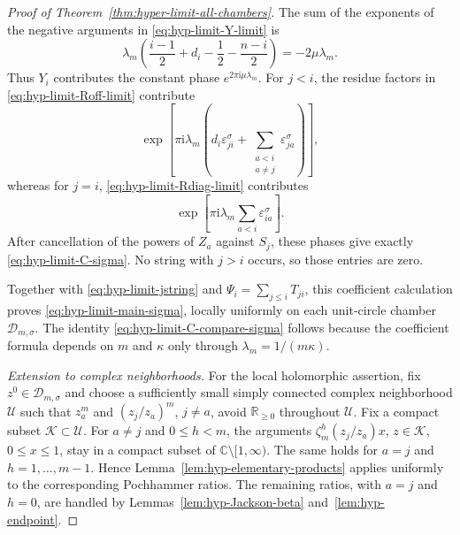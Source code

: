 \documentclass[12pt]{amsart}
\theoremstyle{definition}
\numberwithin{equation}{section}
\theoremstyle{definition}
\let\mc\mathcal
\let\eps\varepsilon
\let\ka\kappa
\let\si\sigma
\let\ge\geqslant
\let\le\leqslant
\def\C{{\mathbb C}}
\def\R{{\mathbb R}}
\def\beq{\begin{equation}}
\def\eeq{\end{equation}}
\begin{document}
\begin{proof}[Proof of Theorem~\ref{thm:hyper-limit-all-chambers}]
The sum of the exponents of the negative arguments in
\eqref{eq:hyp-limit-Y-limit} is
\beq\label{eq:hyp-limit-Y-phase-sum}
 \lambda_m\left(\frac{i-1}{2}+d_i-\frac12-\frac{n-i}{2}\right)
 =-2\mu\lambda_m.
\eeq
Thus $Y_i$ contributes the constant phase
$e^{2\pi\mathrm{i}\mu\lambda_m}$. For $j<i$, the residue factors
in \eqref{eq:hyp-limit-Roff-limit} contribute
\beq\label{eq:hyp-limit-residue-phase-off-sigma}
 \exp\!\left[\pi\mathrm{i}\lambda_m\left(
 d_i\eps_{ji}^\si+
 \sum_{\substack{a<i\\a\ne j}}\eps_{ja}^\si\right)\right],
\eeq
whereas for $j=i$, \eqref{eq:hyp-limit-Rdiag-limit} contributes
\beq\label{eq:hyp-limit-residue-phase-diag-sigma}
 \exp\!\left[\pi\mathrm{i}\lambda_m
                 \sum_{a<i}\eps_{ia}^\si\right].
\eeq
After cancellation of the powers of $Z_a$ against $S_j$, these
phases give exactly \eqref{eq:hyp-limit-C-sigma}. No string with
$j>i$ occurs, so those entries are zero.

Together with \eqref{eq:hyp-limit-jstring} and
$\Psi_i=\sum_{j\le i}T_{ji}$, this coefficient calculation
proves \eqref{eq:hyp-limit-main-sigma}, locally uniformly on
each unit-circle chamber $\mc D_{m,\si}$.
The identity \eqref{eq:hyp-limit-C-compare-sigma} follows
because the coefficient formula depends on $m$ and $\ka$
only through $\lambda_m=1/(m\ka)$.

\medskip
\noindent\emph{Extension to complex neighborhoods.}
For the local holomorphic assertion, fix $z^0\in\mc D_{m,\si}$
and choose a sufficiently small simply connected complex
neighborhood $\mc U$ such that $z_a^m$ and $(z_j/z_a)^m$,
$j\ne a$, avoid $\R_{\ge0}$ throughout $\mc U$.
Fix a compact subset $\mc K\subset\mc U$.
For $a\ne j$ and $0\le h<m$, the arguments
$\zeta_m^h(z_j/z_a)x$, $z\in\mc K$, $0\le x\le1$,
stay in a compact subset of $\C\setminus[1,\infty)$.
The same holds for $a=j$ and $h=1,\ldots,m-1$.
Hence Lemma~\ref{lem:hyp-elementary-products} applies
uniformly to the corresponding Pochhammer ratios.
The remaining ratios, with $a=j$ and $h=0$, are
handled by Lemmas~\ref{lem:hyp-Jackson-beta}
and~\ref{lem:hyp-endpoint}.


\end{proof}
\end{document}
